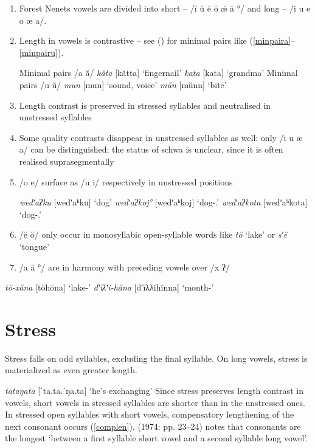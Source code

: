 \documentclass[a4paper, 12pt]{article}
\newcommand{\citeay}[2][]{
   \citeauthor{#2} (\citeyear[#1]{#2})}
\begin{document}
	\begin{enumerate}[$\gg$]
		\item Forest Nenets vowels are divided into short – /ĭ ŭ ĕ ŏ æ̆ ă °/ and long – /i u e o æ a/.
		\item Length in vowels is contrastive -- see \citeay{sammallahti1974} for minimal pairs like (\ref{minpaira}--\ref{minpairu}).
		
	\pex\label{minpaira}Minimal pairs /a ă/ \parencite[p. 20]{sammallahti1974}
		\a \emph{kăta} [kătta] \hfill `fingernail'
		\a \emph{kata} [kata] \hfill `grandma'
	\xe
	\pex\label{minpairu}Minimal pairs /u ŭ/
		\a \emph{mun} [mun] \hfill `sound, voice'
		\a \emph{mŭn} [mŭnn] \hfill `bite'
	\xe
	
		\item Length contrast is preserved in stressed syllables and neutralised in unstressed syllables
		\item Some quality contrasts disappear in unstressed syllables as well: only /i u æ a/ can be distinguished; the status of schwa is unclear, since it is often realised suprasegmentally
		\item /o e/ surface as /u i/ respectively in unstressed positions
		
	\pex\label{}\a \emph{wedʹaʔku} [wedʹaʰku] \hfill `dog'
		\a \emph{wedʹaʔkoj°} [wedʹaʰkoj] \hfill `dog-{\Poss}.{\Fsg}'
		\a \emph{wedʹaʔkota} [wedʹaʰkota] \hfill `dog-{\Poss}.{\Tsg}'
	\xe
		
		\item /ĕ ŏ/ only occur in monosyllabic open-syllable words like \emph{tŏ} `lake’ or \emph{sʹĕ} `tongue’
		\item /a ă °/ are in harmony with preceding vowels over /x ʔ/
	\end{enumerate}

	\pex\label{assim}
		\a \emph{tŏ-xăna} [tŏhŏna] \hfill `lake-{\Loc}' 
		\a \emph{dʹĭλʹi-hăna} [dʹĭλλihĭnna] \hfill `month-{\Loc}'
	\xe
	
		\section{Stress}
	
	Stress falls on odd syllables, excluding the final syllable. On long vowels, stress is materialized as even greater length.

	\ex\label{}\emph{tataŋata} [ˈta.ta.ˈŋa.ta] \hfill `he’s exchanging' \xe
	Since stress preserves length contrast in vowels, short vowels in stressed syllables are shorter than in the unstressed ones. In stressed open syllables with short vowels, compensatory lengthening of the next consonant occurs (\ref{complen}). \citeauthor{sammallahti1974} (1974: pp. 23--24) notes that consonants are the longest `between a first syllable short vowel and a second syllable long vowel'.
\end{document}
